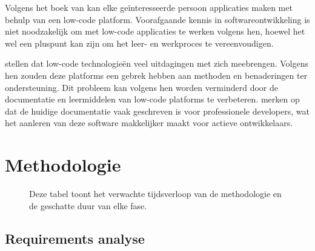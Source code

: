 Volgens het boek van \textcite{kenneweg2021building} kan elke geïnteresseerde persoon applicaties maken met behulp van een low-code platform. Voorafgaande kennis in softwareontwikkeling is niet noodzakelijk om met low-code applicaties te werken volgens hen, hoewel het wel een pluspunt kan zijn om het leer- en werkproces te vereenvoudigen.

\vspace{\baselineskip}

\textcite{rokis2022challenges} stellen dat low-code technologieën veel uitdagingen met zich meebrengen. Volgens hen zouden deze platforms een gebrek hebben aan methoden en benaderingen ter ondersteuning. Dit probleem kan volgens hen worden verminderd door de documentatie en leermiddelen van low-code platforms te verbeteren. \textcite{bernsteiner2022citizen} merken op dat de huidige documentatie vaak geschreven is voor professionele developers, wat het aanleren van deze software makkelijker maakt voor actieve ontwikkelaars.

\section{Methodologie}%
\label{sec:methodologie}

\begin{figure}[p]
  \centering
  \scalebox{1.10} {%
  }
  \label{fig:your-figure-label}
  \caption[Tijdsverloop methodologie:]{Deze tabel toont het verwachte tijdsverloop van de methodologie en de geschatte duur van elke fase.}
\end{figure}

\subsection{Requirements analyse}
\label{sec:Requirements analyse}

